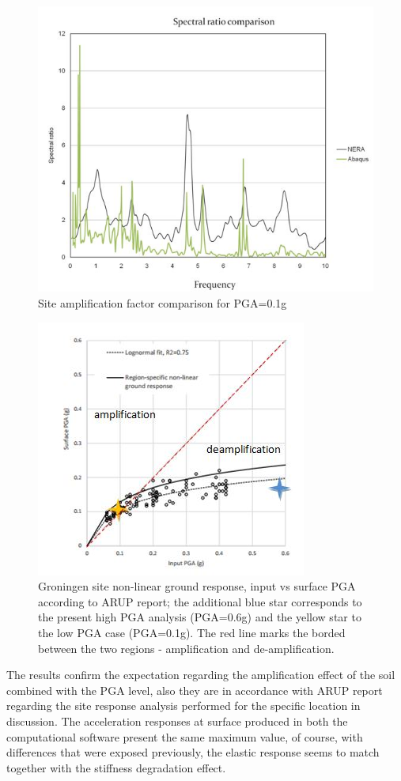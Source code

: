 	\begin{figure}[h!]
		\centering
		\includegraphics[width=0.7\linewidth]{"spectral2"}
		\caption{Site amplification factor comparison for PGA=0.1g}
		\label{SAF}
	\end{figure}
	\begin{figure}[h!]
		\centering
		\includegraphics[width=0.7\linewidth]{"ARUP"}
		\caption{Groningen site non-linear ground response, input vs surface PGA according to ARUP report; the additional blue star corresponds to the present high PGA analysis (PGA=0.6g) and the yellow star to the low PGA case (PGA=0.1g). The red line marks the borded between the two regions - amplification and de-amplification.}
		\label{ARUP}
	\end{figure}
	
	The results confirm the expectation regarding the amplification effect of the soil combined with the PGA level, also they are in accordance with ARUP report regarding the site response analysis performed for the specific location in discussion. The acceleration responses at surface produced in both the computational software present the same maximum value, of course, with differences that were exposed previously, the elastic response seems to match together with the stiffness degradation effect. 
	

